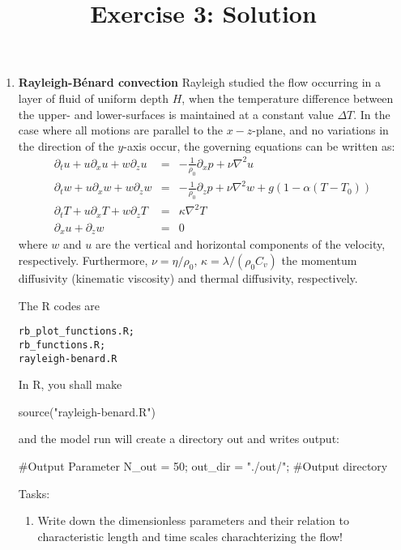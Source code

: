 \documentclass[a4paper,12pt]{article}
\title{Exercise 3: Solution}
\newcommand{\beqn}{\begin{eqnarray}}
\newcommand{\eeqn}{\end{eqnarray}}
\renewcommand{\beqn}{\begin{eqnarray}}
\renewcommand{\eeqn}{\end{eqnarray}}
\begin{document}
\maketitle
\thispagestyle{fancy}
%

 \begin{enumerate}

\item
{\bf Rayleigh-B\'{e}nard convection }
Rayleigh studied the flow occurring in a layer of fluid of uniform
depth $H$, when the temperature difference between the upper- and lower-surfaces
is maintained at a constant value $\Delta T$.
In the case where all motions are parallel to the $x-z$-plane, and no variations
in the direction of the $y$-axis occur, the governing equations can be written as:
\beqn
    \partial_t u + u \partial_x u + w \partial_z u     & = & - \frac{1}{\rho_0} \partial_x p +        \nu \nabla^2 u  \label{eqref:einse}\\
    \partial_t w + u \partial_x w + w \partial_z w   & = &  - \frac{1}{\rho_0} \partial_z p +        \nu \nabla^2 w + g (1- \alpha (T-T_0))
        \label{eqref:zwei}\\
    \partial_t T + u \partial_x T + w \partial_z T   &=&  \kappa \nabla^2 T 
    \label{eqref:temp}\\
    \partial_x u + \partial_z w   &= &0\label{eqref:kont}
\eeqn
where $w$ and $u$ are the vertical and horizontal components of the velocity,
respectively. 
Furthermore, 
$ \nu = \eta/\rho_0 , \, \kappa = \lambda/(\rho_0 C_v) $ 
the momentum diffusivity (kinematic viscosity) and thermal diffusivity, respectively.


The R codes are 
\begin{verbatim}
rb_plot_functions.R; 
rb_functions.R; 
rayleigh-benard.R
\end{verbatim}
In R, you shall make
\begin{rcode}
source("rayleigh-benard.R")
\end{rcode}
and the model run will create a directory out and writes output: 
\begin{rcode}
#Output Parameter
N_out = 50;
out_dir = "./out/";	#Output directory
\end{rcode}


Tasks:
 \begin{enumerate}
 \item
 Write down the dimensionless parameters and their relation to
 characteristic length and time scales charachterizing the flow!


\end{enumerate}
\end{enumerate}
\end{document}
